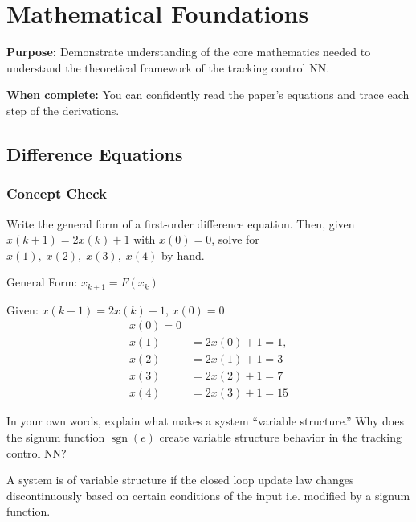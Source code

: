 \section{Mathematical Foundations}

\begin{purposebox}
	\textbf{Purpose:} Demonstrate understanding of the core mathematics needed to understand the theoretical framework of the tracking control NN.
	
	\textbf{When complete:} You can confidently read the paper's equations and trace each step of the derivations.
\end{purposebox}

\subsection{Difference Equations}

\subsubsection*{Concept Check}

Write the general form of a first-order difference equation. Then, given $x(k+1) = 2x(k) + 1$ with $x(0) = 0$, solve for $x(1),\; x(2),\; x(3),\; x(4)$ by hand.
\begin{answerbox}
	\centering General Form: $x_{ k+1 } = F(x_{ k })$
\end{answerbox}
\begin{answerbox}
	\centering Given: $x(k+1) = 2x(k) + 1$, $x(0) = 0$
	\begin{align}
		x(0) = 0                 \\
		x(1) & = 2x(0) + 1 = 1,  \\
		x(2) & = 2x(1) + 1 = 3   \\
		x(3) & = 2x(2) + 1 = 7   \\
		x(4) & = 2x(3) + 1 = 15
	\end{align}
\end{answerbox}

In your own words, explain what makes a system ``variable structure.'' Why does the signum function $\operatorname{sgn}(e)$ create variable structure behavior in the tracking control NN?

\begin{answerbox}
	A system is of variable structure if the closed loop update law changes discontinuously
	based on certain conditions of the input i.e. modified by a signum function.
\end{answerbox}

